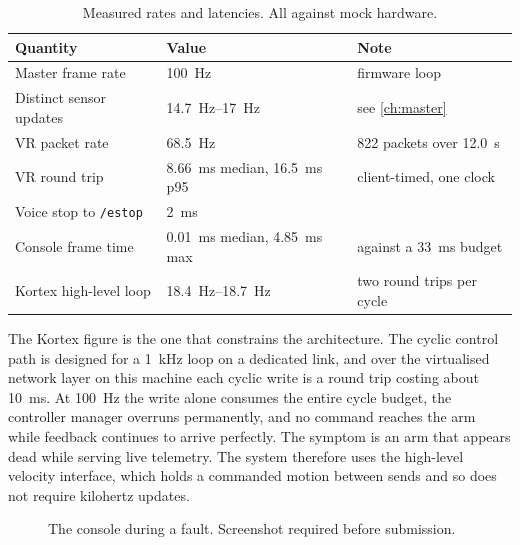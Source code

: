 \begin{table}[htbp]
  \centering
  \caption{Measured rates and latencies. All against mock hardware.}
  \label{tab:perf}
  \begin{tabular}{@{}lll@{}}
    \toprule
    Quantity & Value & Note \\
    \midrule
    Master frame rate       & \SI{100}{\hertz} & firmware loop \\
    Distinct sensor updates & \SIrange{14.7}{17}{\hertz} & see \cref{ch:master} \\
    VR packet rate          & \SI{68.5}{\hertz} & 822 packets over \SI{12.0}{\second} \\
    VR round trip           & \SI{8.66}{\milli\second} median, \SI{16.5}{\milli\second} p95
                            & client-timed, one clock \\
    Voice stop to \texttt{/estop} & \SI{2}{\milli\second} & \\
    Console frame time      & \SI{0.01}{\milli\second} median, \SI{4.85}{\milli\second} max
                            & against a \SI{33}{\milli\second} budget \\
    Kortex high-level loop  & \SIrange{18.4}{18.7}{\hertz} & two round trips per cycle \\
    \bottomrule
  \end{tabular}
\end{table}

The Kortex figure is the one that constrains the architecture. The cyclic
control path is designed for a \SI{1}{\kilo\hertz} loop on a dedicated link,
and over the virtualised network layer on this machine each cyclic write is a
round trip costing about \SI{10}{\milli\second}. At \SI{100}{\hertz} the write
alone consumes the entire cycle budget, the controller manager overruns
permanently, and no command reaches the arm while feedback continues to arrive
perfectly. The symptom is an arm that appears dead while serving live
telemetry. The system therefore uses the high-level velocity interface, which
holds a commanded motion between sends and so does not require kilohertz
updates.

\begin{figure}[htbp]
  \centering
  \caption[Operations console]{The console during a fault. Screenshot required
  before submission.}
  \label{fig:console}
\end{figure}

